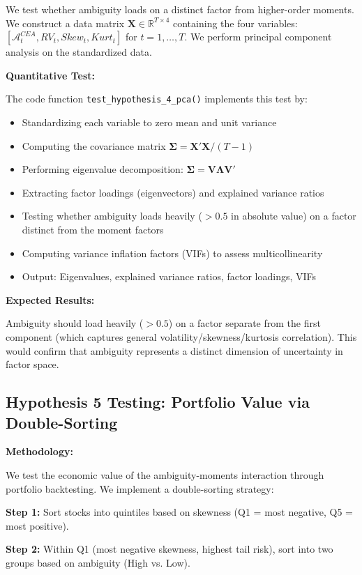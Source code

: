 \documentclass[preprint,12pt,authoryear]{elsarticle}
\begin{document}
We test whether ambiguity loads on a distinct factor from higher-order moments. We construct a data matrix $\mathbf{X} \in \mathbb{R}^{T \times 4}$ containing the four variables: $[\mathcal{A}^{CEA}_t, RV_t, Skew_t, Kurt_t]$ for $t = 1, \ldots, T$. We perform principal component analysis on the standardized data.

\noindent
\textbf{Quantitative Test:}

The code function \texttt{test\_hypothesis\_4\_pca()} implements this test by:
\begin{itemize}
\item Standardizing each variable to zero mean and unit variance
\item Computing the covariance matrix $\mathbf{\Sigma} = \mathbf{X}'\mathbf{X} / (T-1)$
\item Performing eigenvalue decomposition: $\mathbf{\Sigma} = \mathbf{V}\mathbf{\Lambda}\mathbf{V}'$
\item Extracting factor loadings (eigenvectors) and explained variance ratios
\item Testing whether ambiguity loads heavily ($>0.5$ in absolute value) on a factor distinct from the moment factors
\item Computing variance inflation factors (VIFs) to assess multicollinearity
\item Output: Eigenvalues, explained variance ratios, factor loadings, VIFs
\end{itemize}

\noindent
\textbf{Expected Results:}

Ambiguity should load heavily ($>0.5$) on a factor separate from the first component (which captures general volatility/skewness/kurtosis correlation). This would confirm that ambiguity represents a distinct dimension of uncertainty in factor space.

\subsection{Hypothesis 5 Testing: Portfolio Value via Double-Sorting}

\noindent
\textbf{Methodology:}

We test the economic value of the ambiguity-moments interaction through portfolio backtesting. We implement a double-sorting strategy:

\textbf{Step 1:} Sort stocks into quintiles based on skewness (Q1 = most negative, Q5 = most positive).

\textbf{Step 2:} Within Q1 (most negative skewness, highest tail risk), sort into two groups based on ambiguity (High vs. Low).
\end{document}

